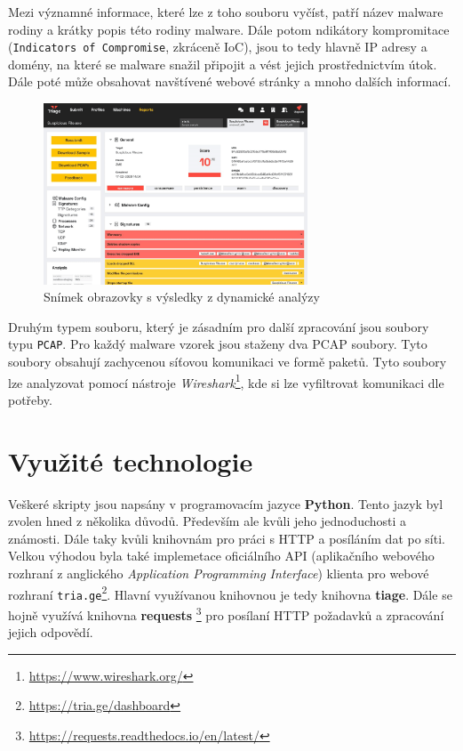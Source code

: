 Mezi významné informace, které lze z toho souboru vyčíst, patří název malware rodiny a krátky popis této rodiny malware. Dále potom ndikátory kompromitace (\texttt{Indicators of Compromise}, zkráceně IoC), 
jsou to tedy hlavně IP adresy a domény, na které se malware snažil připojit a vést jejich prostřednictvím útok. Dále poté může obsahovat navštívené webové stránky a mnoho dalších informací.

\begin{figure}[h]
	\centering
        \includegraphics[width=0.7\textwidth]{obrazky/3-triage-report.png}
	\caption{Snímek obrazovky s výsledky z dynamické analýzy}
    \label{Report_image}
\end{figure}

Druhým typem souboru, který je zásadním pro další zpracování jsou soubory typu \texttt{PCAP}. Pro každý malware vzorek jsou staženy dva PCAP soubory.
Tyto soubory obsahují zachycenou síťovou komunikaci ve formě paketů. Tyto soubory lze analyzovat pomocí nástroje \textit{Wireshark}\footnote{\href{https://www.wireshark.org/}{https://www.wireshark.org/}}, 
kde si lze vyfiltrovat komunikaci dle potřeby.

\newpage
\section{Využité technologie}

Veškeré skripty jsou napsány v programovacím jazyce \textbf{Python}. Tento jazyk byl zvolen hned z několika důvodů.
Především ale kvůli jeho jednoduchosti a známosti. Dále taky kvůli knihovnám pro práci s HTTP a posíláním dat po síti.
Velkou výhodou byla také implemetace oficiálního API (aplikačního webového rozhraní z anglického \textit{Application Programming Interface}) klienta pro webové rozhraní 
\texttt{tria.ge}\footnote{\href{https://tria.ge/dashboard}{https://tria.ge/dashboard}}. 
Hlavní využívanou knihovnou je tedy knihovna \textbf{tiage}. Dále se hojně využívá knihovna \textbf{requests} \footnote{\href{https://requests.readthedocs.io/en/latest/}{https://requests.readthedocs.io/en/latest/}}
pro posílaní HTTP požadavků a zpracování jejich odpovědí.

